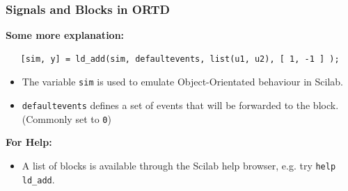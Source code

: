 \documentclass[serif,9pt,xcolor=dvipsnames]{beamer}
\begin{document}
\begin{frame}[fragile]
\frametitle{Signals and Blocks in ORTD}
 
 \textbf{Some more explanation:}

{\small 
\begin{lstlisting}
   [sim, y] = ld_add(sim, defaultevents, list(u1, u2), [ 1, -1 ] );
\end{lstlisting}}
 
 \begin{itemize}
  \item The variable \texttt{sim} is used to emulate Object-Orientated behaviour in Scilab.
\item \texttt{defaultevents} defines a set of events that will be forwarded to the block. (Commonly set to \texttt{0})
 \end{itemize}

 \vspace{1.5cm}

\textbf{For Help:}
 \begin{itemize}
  \item A list of blocks is available through the Scilab help browser, e.g. try \texttt{help ld\_add}.
 \end{itemize}
 

\end{frame}
\end{document}
